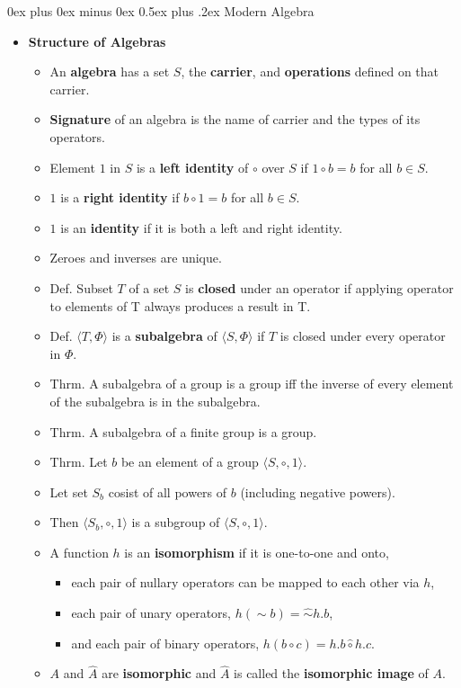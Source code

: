 \documentclass[letterpaper, 8pt]{extarticle}
\makeatletter
\renewcommand{\section}{\@startsection{section}{1}{0mm}%
                                {0ex plus 0ex minus 0ex}%
                                {0.5ex plus .2ex}%
                                {\normalfont\normalsize\bfseries}}
\makeatother
\begin{document}
\begin{multicols*}{3}
    \section{Modern Algebra}
    \begin{itemize}
    \item \textbf{Structure of Algebras}
        \begin{itemize}
            \item An \textbf{algebra} has a set $S$, the \textbf{carrier}, and \textbf{operations} defined on that carrier.
            \item \textbf{Signature} of an algebra is the name of carrier and the types of its operators.
            \item Element $1$ in $S$ is a \textbf{left identity} of $\circ$ over $S$ if $1 \circ b = b$ for all $b \in S$.
            \item $1$ is a \textbf{right identity} if $b \circ 1 = b$ for all $b \in S$.
            \item $1$ is an \textbf{identity} if it is both a left and right identity.
            \item Zeroes and inverses are unique.
            \item Def. Subset $T$ of a set $S$ is \textbf{closed} under an operator if applying operator to elements of T always produces a result in T.
            \item Def. $\langle T, \Phi \rangle$ is a \textbf{subalgebra} of $\langle S, \Phi \rangle$ if $T$ is closed under every operator in $\Phi$.
            \item Thrm. A subalgebra of a group is a group iff the inverse of every element of the subalgebra is in the subalgebra.
            \item Thrm. A subalgebra of a finite group is a group.
            \item Thrm. Let $b$ be an element of a group $\langle S, \circ, 1 \rangle$.
            \item Let set $S_b$ cosist of all powers of $b$ (including negative powers).
            \item Then $\langle S_b, \circ, 1 \rangle$ is a subgroup of $\langle S, \circ, 1 \rangle$.
            \item A function $h$ is an \textbf{isomorphism} if it is one-to-one and onto,
            \begin{itemize}
                \item each pair of nullary operators can be mapped to each other via $h$,
                \item each pair of unary operators, $h(\sim b) = \hat{\sim} h.b$,
                \item and each pair of binary operators, $h(b \circ c) = h.b \hat{\circ} h.c$.
            \end{itemize}
            \item $A$ and $\hat{A}$ are \textbf{isomorphic} and $\hat{A}$ is called the \textbf{isomorphic image} of $A$.
        \end{itemize}


\end{itemize}
\end{multicols*}
\end{document}
